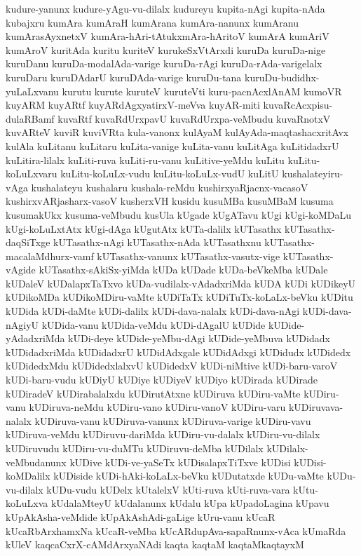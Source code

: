 {kudure-yanunx
kudure-yAgu-vu-dilalx
kudureyu
kupita-nAgi
kupita-nAda
kubajxru
kumAra
kumAraH
kumArana
kumAra-nanunx
kumAranu
kumArasAyxnetxV
kumAra-hAri-tAtukxmAra-hAritoV
kumArA
kumAriV
kumAroV
kuritAda
kuritu
kuriteV
kurukeSxVtArxdi
kuruDa
kuruDa-nige
kuruDanu
kuruDa-modalAda-varige
kuruDa-rAgi
kuruDa-rAda-varigelalx
kuruDaru
kuruDAdarU
kuruDAda-varige
kuruDu-tana
kuruDu-budidhx-yuLaLxvanu
kurutu
kurute
kuruteV
kuruteVti
kuru-pacnAcxlAnAM
kumoVR
kuyARM
kuyARtf
kuyARdAgxyatirxV-meVva
kuyAR-miti
kuvaRcAcxpisu-dulaRBamf
kuvaRtf
kuvaRdUrxpavU
kuvaRdUrxpa-veMbudu
kuvaRnotxV
kuvARteV
kuviR
kuviVRta
kula-vanonx
kulAyaM
kulAyAda-maqtashacxritAvx
kulAla
kuLitanu
kuLitaru
kuLita-vanige
kuLita-vanu
kuLitAga
kuLitidadxrU
kuLitira-lilalx
kuLiti-ruva
kuLiti-ru-vanu
kuLitive-yeMdu
kuLitu
kuLitu-koLuLxvaru
kuLitu-koLuLx-vudu
kuLitu-koLuLx-vudU
kuLitU
kushalateyiru-vAga
kushalateyu
kushalaru
kushala-reMdu
kushirxyaRjacnx-vacasoV
kushirxvARjasharx-vasoV
kusherxVH
kusidu
kusuMBa
kusuMBaM
kusuma
kusumakUkx
kusuma-veMbudu
kusUla
kUgade
kUgATavu
kUgi
kUgi-koMDaLu
kUgi-koLuLxtAtx
kUgi-dAga
kUgutAtx
kUTa-dalilx
kUTasathx
kUTasathx-daqSiTxge
kUTasathx-nAgi
kUTasathx-nAda
kUTasathxnu
kUTasathx-macalaMdhurx-vamf
kUTasathx-vanunx
kUTasathx-vasutx-vige
kUTasathx-vAgide
kUTasathx-sAkiSx-yiMda
kUDa
kUDade
kUDa-beVkeMba
kUDale
kUDaleV
kUDalapxTaTxvo
kUDa-vudilalx-vAdadxriMda
kUDA
kUDi
kUDikeyU
kUDikoMDa
kUDikoMDiru-vaMte
kUDiTaTx
kUDiTuTx-koLaLx-beVku
kUDitu
kUDida
kUDi-daMte
kUDi-dalilx
kUDi-dava-nalalx
kUDi-dava-nAgi
kUDi-dava-nAgiyU
kUDida-vanu
kUDida-veMdu
kUDi-dAgalU
kUDide
kUDide-yAdadxriMda
kUDi-deye
kUDide-yeMbu-dAgi
kUDide-yeMbuva
kUDidadx
kUDidadxriMda
kUDidadxrU
kUDidAdxgale
kUDidAdxgi
kUDidudx
kUDidedx
kUDidedxMdu
kUDidedxlalxvU
kUDidedxV
kUDi-niMtive
kUDi-baru-varoV
kUDi-baru-vudu
kUDiyU
kUDiye
kUDiyeV
kUDiyo
kUDirada
kUDirade
kUDiradeV
kUDirabalalxdu
kUDirutAtxne
kUDiruva
kUDiru-vaMte
kUDiru-vanu
kUDiruva-neMdu
kUDiru-vano
kUDiru-vanoV
kUDiru-varu
kUDiruvava-nalalx
kUDiruva-vanu
kUDiruva-vanunx
kUDiruva-varige
kUDiru-vavu
kUDiruva-veMdu
kUDiruvu-dariMda
kUDiru-vu-dalalx
kUDiru-vu-dilalx
kUDiruvudu
kUDiru-vu-duMTu
kUDiruvu-deMba
kUDilalx
kUDilalx-veMbudanunx
kUDive
kUDi-ve-yaSeTx
kUDisalapxTiTxve
kUDisi
kUDisi-koMDalilx
kUDiside
kUDi-hAki-koLaLx-beVku
kUDutatxde
kUDu-vaMte
kUDu-vu-dilalx
kUDu-vudu
kUDelx
kUtalelxV
kUti-ruva
kUti-ruva-vara
kUtu-koLuLxva
kUdalaMteyU
kUdalanunx
kUdalu
kUpa
kUpadoLagina
kUpavu
kUpAkAsha-veMdide
kUpAkAshAdi-gaLige
kUru-vanu
kUcaR
kUcaRbArxhamxNa
kUcaR-veMba
kUcARdupAva-sapaRnunx-vAca
kUmaRda
kUleV
kaqcaCxrX-cAMdArxyaNAdi
kaqta
kaqtaM
kaqtaMkaqtayxM
}
